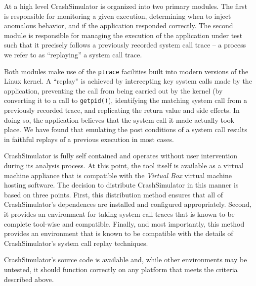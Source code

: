     At a high level CrashSimulator is organized into two primary modules. The
    first is responsible for monitoring a given execution, determining
    when to inject anomalous behavior, and if the
    application responded correctly.  The second module
    is responsible for managing the execution of the application under test such
    that it precisely follows a previously recorded system call trace -- a
    process we refer to as ``replaying'' a system call trace.

        
    Both modules make use of the {\tt ptrace} facilities built into modern
    versions of the Linux kernel.  A ``replay''
    is achieved by intercepting key system calls made by the application,
    preventing the call from being carried out by the kernel (by
    converting it to a call to {\tt getpid()}), identifying the matching system
    call from a previously recorded trace, and replicating the return value
    and side effects. In doing so, the application believes that the system call it
    made actually took place. We have found that emulating the post conditions
    of a system call results in faithful replays of a
    previous execution in most cases.

    CrashSimulator is fully self contained and operates without user
    intervention during its analysis process. At this point, the tool 
    itself is available as a virtual machine appliance that is compatible with the
    \emph{Virtual Box} virtual machine hosting software.  The decision to
    distribute CrashSimulator in this manner is based on three points.  First, this
    distribution method ensures that all of CrashSimulator's dependences are
    installed and configured appropriately.  Second, it provides an
    environment for taking system call traces that is known to be complete
    tool-wise and compatible.  Finally, and most importantly,
    this method provides an environment that is known to be compatible with the
    details of CrashSimulator's system call replay techniques.

    CrashSimulator's source code is available and, while other environments may
    be untested, it should function correctly on any platform that meets the
    criteria described above.
